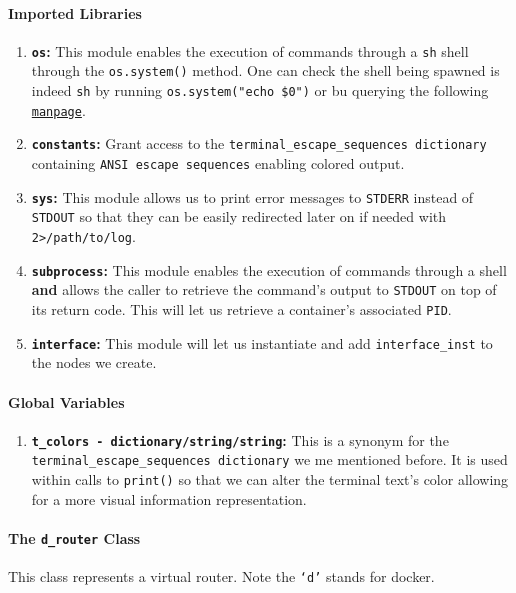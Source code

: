     \paragraph{Imported Libraries}
        \begin{enumerate}
            \item \textbf{\texttt{os}:} This module enables the execution of commands through a \texttt{sh} shell through the \texttt{os.system()} method. One can check the shell being spawned is indeed \texttt{sh} by running \texttt{\allowbreak os.system("echo \$0")} or bu querying the following \href{https://linux.die.net/man/3/system}{\texttt{manpage}}.
            \item \textbf{\texttt{constants}:} Grant access to the \texttt{\allowbreak terminal\_escape\_sequences dictionary} containing \texttt{ANSI escape sequences} enabling colored output.
            \item \textbf{\texttt{sys}:} This module allows us to print error messages to \texttt{STDERR} instead of \texttt{STDOUT} so that they can be easily redirected later on if needed with \texttt{2>/path/to/log}.
            \item \textbf{\texttt{subprocess}:} This module enables the execution of commands through a shell \textbf{and} allows the caller to retrieve the command's output to \texttt{STDOUT} on top of its return code. This will let us retrieve a container's associated \texttt{PID}.
            \item \textbf{\texttt{interface}:} This module will let us instantiate and add \texttt{interface\_inst} to the nodes we create.
        \end{enumerate}

    \paragraph{Global Variables}
        \begin{enumerate}
            \item \textbf{\texttt{\allowbreak t\_colors - dictionary/string/string}:} This is a synonym for the \texttt{\allowbreak terminal\_escape\_sequences dictionary} we me mentioned before. It is used within calls to \texttt{print()} so that we can alter the terminal text's color allowing for a more visual information representation.
        \end{enumerate}

    \paragraph{The \texttt{d\_router} Class}
        This class represents a virtual router. Note the \texttt{`d'} stands for docker.

